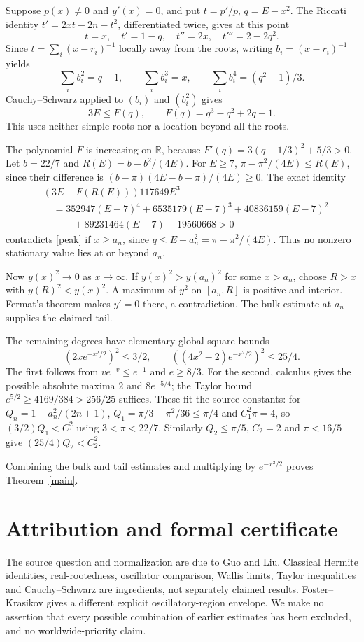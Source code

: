\documentclass[11pt]{article}
\begin{document}
Suppose $p(x)\ne0$ and $y'(x)=0$, and put $t=p'/p$, $q=E-x^2$. The Riccati identity $t'=2xt-2n-t^2$, differentiated twice, gives at this point
\[
 t=x,\quad t'=1-q,\quad t''=2x,\quad t'''=2-2q^2.
\]
Since $t=\sum_i(x-r_i)^{-1}$ locally away from the roots, writing $b_i=(x-r_i)^{-1}$ yields
\[
 \sum_i b_i^2=q-1,\qquad \sum_i b_i^3=x,\qquad
 \sum_i b_i^4=(q^2-1)/3.
\]
Cauchy--Schwarz applied to $(b_i)$ and $(b_i^2)$ gives
\begin{equation}\label{peak}
 3E\leq F(q),\qquad F(q)=q^3-q^2+2q+1.
\end{equation}
This uses neither simple roots nor a location beyond all the roots.

The polynomial $F$ is increasing on $\mathbb R$, because
$F'(q)=3(q-1/3)^2+5/3>0$. Let $b=22/7$ and $R(E)=b-b^2/(4E)$. For $E\geq7$,
$\pi-\pi^2/(4E)\leq R(E)$, since their difference is
$(b-\pi)(4E-b-\pi)/(4E)\geq0$. The exact identity
\begin{align*}
 &(3E-F(R(E)))117649E^3\\
 &\quad=352947(E-7)^4+6535179(E-7)^3+40836159(E-7)^2\\
 &\qquad\quad+89231464(E-7)+19560668>0
\end{align*}
contradicts \eqref{peak} if $x\geq a_n$, since $q\leq E-a_n^2=\pi-\pi^2/(4E)$. Thus no nonzero stationary value lies at or beyond $a_n$.

Now $y(x)^2\to0$ as $x\to\infty$. If $y(x)^2>y(a_n)^2$ for some $x>a_n$, choose $R>x$ with $y(R)^2<y(x)^2$. A maximum of $y^2$ on $[a_n,R]$ is positive and interior. Fermat's theorem makes $y'=0$ there, a contradiction. The bulk estimate at $a_n$ supplies the claimed tail.

The remaining degrees have elementary global square bounds
\[
 (2xe^{-x^2/2})^2\leq3/2,\qquad ((4x^2-2)e^{-x^2/2})^2\leq25/4.
\]
The first follows from $ve^{-v}\leq e^{-1}$ and $e\geq8/3$. For the second, calculus gives the possible absolute maxima $2$ and $8e^{-5/4}$; the Taylor bound $e^{5/2}\geq4169/384>256/25$ suffices. These fit the source constants: for $Q_n=1-a_n^2/(2n+1)$, $Q_1=\pi/3-\pi^2/36\leq\pi/4$ and $C_1^2\pi=4$, so $(3/2)Q_1<C_1^2$ using $3<\pi<22/7$. Similarly $Q_2\leq\pi/5$, $C_2=2$ and $\pi<16/5$ give $(25/4)Q_2<C_2^2$.

Combining the bulk and tail estimates and multiplying by $e^{-x^2/2}$ proves Theorem~\ref{main}.

\section*{Attribution and formal certificate}
The source question and normalization are due to Guo and Liu. Classical Hermite identities, real-rootedness, oscillator comparison, Wallis limits, Taylor inequalities and Cauchy--Schwarz are ingredients, not separately claimed results. Foster--Krasikov \cite{FK} gives a different explicit oscillatory-region envelope. We make no assertion that every possible combination of earlier estimates has been excluded, and no worldwide-priority claim.
\end{document}
